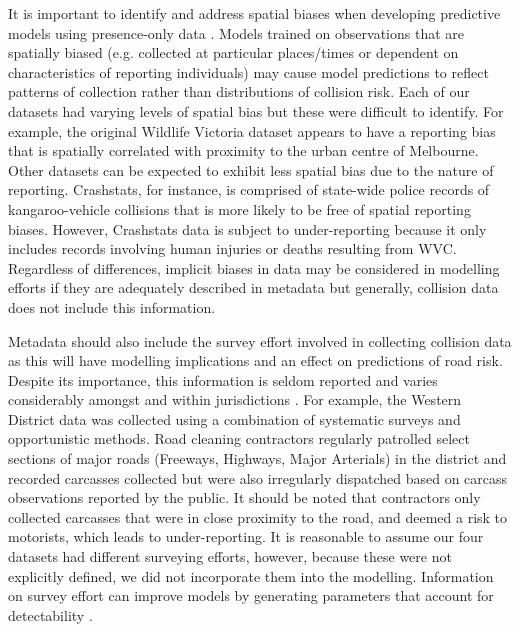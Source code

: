 It is important to identify and address spatial biases when developing predictive models using presence-only data \citep{kram13}. Models trained on observations that are spatially biased (e.g. collected at particular places/times or dependent on characteristics of reporting individuals) may cause model predictions to reflect patterns of collection rather than distributions of collision risk. Each of our datasets had varying levels of spatial bias but these were difficult to identify. For example, the original Wildlife Victoria dataset appears to have a reporting bias that is spatially correlated with proximity to the urban centre of Melbourne. Other datasets can be expected to exhibit less spatial bias due to the nature of reporting. Crashstats, for instance, is comprised of state-wide police records of kangaroo-vehicle collisions that is more likely to be free of spatial reporting biases. However, Crashstats data is subject to under-reporting because it only includes records involving human injuries or deaths resulting from WVC.  Regardless of differences, implicit biases in data may be considered in modelling efforts if they are adequately described in metadata \citep[see][]{wart13} but generally, collision data does not include this information.

Metadata should also include the survey effort involved in collecting collision data as this will have modelling implications and an effect on predictions of road risk. Despite its importance, this information is seldom reported and varies considerably amongst and within jurisdictions \citep{huij07a}. For example, the Western District data was collected using a combination of systematic surveys and opportunistic methods. Road cleaning contractors regularly patrolled select sections of major roads (Freeways, Highways, Major Arterials) in the district and recorded carcasses collected but were also irregularly dispatched based on carcass observations reported by the public. It should be noted that contractors only collected carcasses that were in close proximity to the road, and deemed a risk to motorists, which leads to under-reporting. It is reasonable to assume our four datasets had different surveying efforts, however, because these were not explicitly defined, we did not incorporate them into the modelling. Information on survey effort can improve models by generating parameters that account for detectability \citep[see][]{dora14}.

